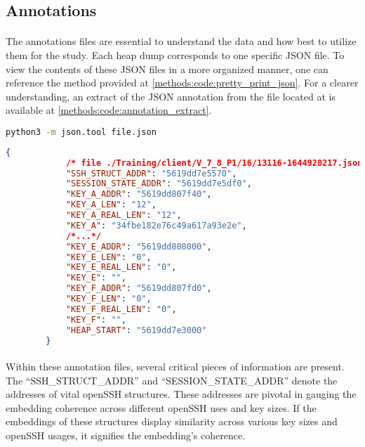     \subsection*{Annotations}
        \paragraph{}The annotations files are essential to understand the data and how best to utilize them for the study. Each heap dump corresponds to one specific JSON file. To view the contents of these JSON files in a more organized manner, one can reference the method provided at \ref{methods:code:pretty_print_json}. For a clearer understanding, an extract of the JSON annotation from the file located at  is available at \ref{methods:code:annotation_extract}.

        \begin{lstlisting}[caption={pretty print JSON}, label=methods:code:pretty_print_json, language=bash]
            python3 -m json.tool file.json
        \end{lstlisting}

        \noindent
        \begin{minipage}{\linewidth}
        \begin{lstlisting}[language=json, caption={An extract of the JSON annotations}, label=methods:code:annotation_extract]
        {
            /* file ./Training/client/V_7_8_P1/16/13116-1644920217.json*/
            "SSH_STRUCT_ADDR": "5619dd7e5570",
            "SESSION_STATE_ADDR": "5619dd7e5df0",
            "KEY_A_ADDR": "5619dd807f40",
            "KEY_A_LEN": "12",
            "KEY_A_REAL_LEN": "12",
            "KEY_A": "34fbe182e76c49a617a93e2e",
            /*...*/
            "KEY_E_ADDR": "5619dd808000",
            "KEY_E_LEN": "0",
            "KEY_E_REAL_LEN": "0",
            "KEY_E": "",
            "KEY_F_ADDR": "5619dd807fd0",
            "KEY_F_LEN": "0",
            "KEY_F_REAL_LEN": "0",
            "KEY_F": "",
            "HEAP_START": "5619dd7e3000"
        }
        \end{lstlisting}
        \end{minipage}

        \paragraph{}Within these annotation files, several critical pieces of information are present. The ``SSH\_STRUCT\_ADDR'' and ``SESSION\_STATE\_ADDR'' denote the addresses of vital openSSH \glspl{structure}. These addresses are pivotal in gauging the embedding coherence across different openSSH uses and key sizes. If the embeddings of these \glspl{structure} display similarity across various key sizes and openSSH usages, it signifies the embedding's coherence.

